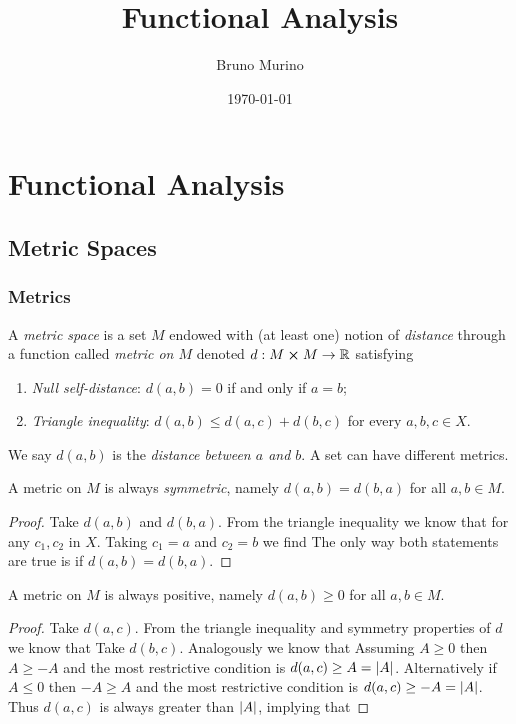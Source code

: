 \documentclass[oneside, 10pt, notitlepage]{book}
\title{Functional Analysis} %
\author{Bruno Murino} %
\date{\today} %
\begin{document}

\dominitoc
\faketableofcontents

\part{Functional Analysis}
\chapter{Metric Spaces}
\minitoc

\section{Metrics}
\begin{definition}
	A \emph{metric space} is a set \(M\) endowed with (at least one) notion of \emph{distance} through a function called \emph{metric on \(M\)} denoted \(d:M\cross M \to \mathbb{R}\) satisfying
	\begin{enumerate}
		\item \emph{Null self-distance}: \(d(a,b)= 0 \) if and only if \(a = b\);
		\item \emph{Triangle inequality}: \(d(a,b) \leq d(a,c) + d(b,c)\) for every \(a,b,c\in X\).
	\end{enumerate}
	We say \(d(a,b)\) is the \emph{distance between \(a\) and \(b\)}. A set can have different metrics.
\end{definition}

\begin{theorem}
	A metric on \(M\) is always \emph{symmetric}, namely \(d(a,b)=d(b,a)\) for all \(a,b\in M\).
\end{theorem}
\begin{proof}
	Take \(d(a,b)\) and \(d(b,a)\). From the triangle inequality we know that
	for any \(c_1,c_2\) in \(X\). Taking \(c_1 = a\) and \(c_2=b\) we find
	The only way both statements are true is if \(d(a,b)=d(b,a)\).
\end{proof}

\begin{theorem}[Positivity]
	A metric on \(M\) is always positive, namely \(d(a,b)\geq 0\) for all \(a,b\in M\).
\end{theorem}
\begin{proof}
	Take \(d(a,c)\). From the triangle inequality and symmetry properties of \(d\) we know that
	Take \(d(b,c)\). Analogously we know that
	Assuming \(A\geq0\) then \(A \geq -A\) and the most restrictive condition is \(d(a,c) \geq A = \abs{A}\). Alternatively if \(A\leq0\) then \(-A \geq A\) and the most restrictive condition is \(d(a,c) \geq -A = \abs{A}\). Thus \(d(a,c)\) is always greater than \(\abs{A}\), implying that
\end{proof}
\end{document}
